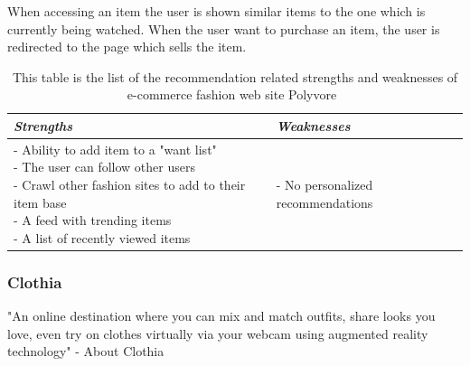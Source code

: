     When accessing an item the user is shown similar items to the one which is currently being watched.
    When the user want to purchase an item, the user is redirected to the page which sells the item.
    \begin{table}[H]
        \centering
        \begin{tabular}{l|l}
            \toprule
            \emph{Strengths} & \emph{Weaknesses} \\ \hline
            \pbox{9cm}{
                - Ability to add item to a "want list" \\
                - The user can follow other users \\
                - Crawl other fashion sites to add to their item base \\
                - A feed with trending items \\
                - A list of recently viewed items
            } & \pbox{9cm}{
                - No personalized recommendations \\
            } \\ \bottomrule
        \end{tabular}
        \caption[Recommendation related strengths and weaknesses of Polyvore~\cite{Polyvore}]{This table is the list of the recommendation related strengths and weaknesses of e-commerce fashion web site Polyvore~\cite{Polyvore}}
        \label{table:ecommenrecePolyvore}
    \end{table}


\subsubsection{Clothia} %
\label{par:clothia}
    "An online destination where you can mix and match outfits, share looks you love, even try on clothes virtually via your webcam using augmented reality technology" - About Clothia~\cite{clothia}

